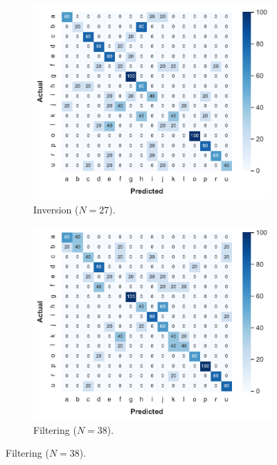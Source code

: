 \begin{figure}[tbp]
    \begin{subfigure}{.49\textwidth}
        \centering
        \includegraphics[width=.99\linewidth]{Figures/RadarExperiments/Datasets/SensorsComparison/Horn/confusion-inversion.pdf}
        \vspace{-18pt}
        \captionsetup{width=.99\linewidth}
        \caption{Inversion ($N{=}27$).}
        \label{fig:radar-experiments:sensors:horn-confusion:inversion}
    \end{subfigure}
    \begin{subfigure}{.49\textwidth}
        \centering
        \includegraphics[width=.99\linewidth]{Figures/RadarExperiments/Datasets/SensorsComparison/Horn/confusion-filtering.pdf}
        \vspace{-18pt}
        \captionsetup{width=.99\linewidth}
        \caption{Filtering ($N{=}38$).}
        \label{fig:radar-experiments:sensors:horn-confusion:filtering}
    \end{subfigure}
    

\end{figure}
